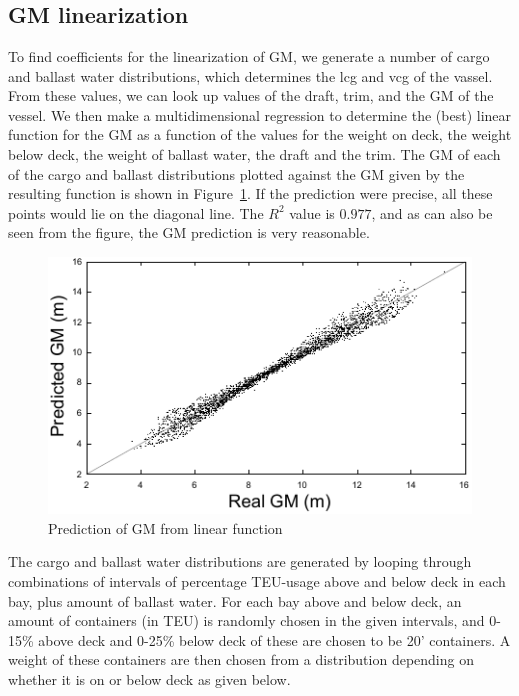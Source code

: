 \section{}\label{sec:implementation}
\subsection{GM linearization}
To find coefficients for the linearization of GM, we generate a number of cargo and ballast water distributions, which determines the lcg and vcg of the vassel. From these values, we can look up values of the draft, trim, and the GM of the vessel. %
We then make a multidimensional regression to determine the (best) linear function for the GM as a function of the values for the weight on deck, the weight below deck, the weight of ballast water, the draft and the trim. The GM of each of the cargo and ballast distributions plotted against the GM given by the resulting function is shown in Figure~\ref{fig:predictGM}. If the prediction were precise, all these points would lie on the diagonal line. The $R^2$ value is $0.977$, and as can also be seen from the figure, the GM prediction is very reasonable.

\begin{figure}[pos=htbp]
	\centering
		\includegraphics[scale=1.2]{figures/gnuPlotAll.pdf}
	\caption{Prediction of GM from linear function}
	\label{fig:predictGM}
\end{figure}

The cargo and ballast water distributions are generated by looping through combinations of intervals of percentage TEU-usage above and below deck in each bay, plus amount of ballast water. For each bay above and below deck, an amount of containers (in TEU) is randomly chosen in the given intervals, and 0-15\% above deck and 0-25\% below deck of these are chosen to be 20' containers. A weight of these containers are then chosen from a distribution depending on whether it is on or below deck as given below.

